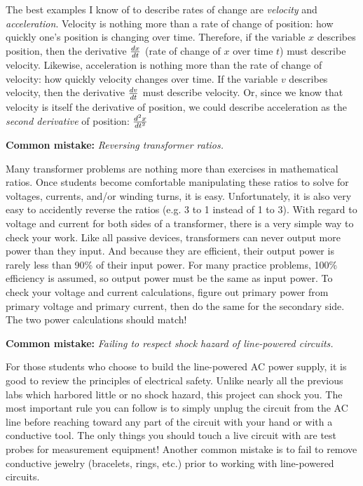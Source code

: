 The best examples I know of to describe rates of change are {\it velocity} and {\it acceleration}.  Velocity is nothing more than a rate of change of position: how quickly one's position is changing over time.  Therefore, if the variable $x$ describes position, then the derivative ${dx \over dt}$ (rate of change of $x$ over time $t$) must describe velocity.  Likewise, acceleration is nothing more than the rate of change of velocity: how quickly velocity changes over time.  If the variable $v$ describes velocity, then the derivative ${dv \over dt}$ must describe velocity.  Or, since we know that velocity is itself the derivative of position, we could describe acceleration as the {\it second derivative} of position: ${d^2 x \over dt^2}$

\vskip 10pt

\noindent
{\bf Common mistake: } {\it Reversing transformer ratios.}

Many transformer problems are nothing more than exercises in mathematical ratios.  Once students become comfortable manipulating these ratios to solve for voltages, currents, and/or winding turns, it is easy.  Unfortunately, it is also very easy to accidently reverse the ratios (e.g. 3 to 1 instead of 1 to 3).  With regard to voltage and current for both sides of a transformer, there is a very simple way to check your work.  Like all passive devices, transformers can never output more power than they input.  And because they are efficient, their output power is rarely less than 90\% of their input power.  For many practice problems, 100\% efficiency is assumed, so output power must be the same as input power.  To check your voltage and current calculations, figure out primary power from primary voltage and primary current, then do the same for the secondary side.  The two power calculations should match!

\vskip 10pt

\noindent
{\bf Common mistake: } {\it Failing to respect shock hazard of line-powered circuits.}

For those students who choose to build the line-powered AC power supply, it is good to review the principles of electrical safety.  Unlike nearly all the previous labs which harbored little or no shock hazard, this project can shock you.  The most important rule you can follow is to simply unplug the circuit from the AC line before reaching toward any part of the circuit with your hand or with a conductive tool.  The only things you should touch a live circuit with are test probes for measurement equipment!  Another common mistake is to fail to remove conductive jewelry (bracelets, rings, etc.) prior to working with line-powered circuits.
